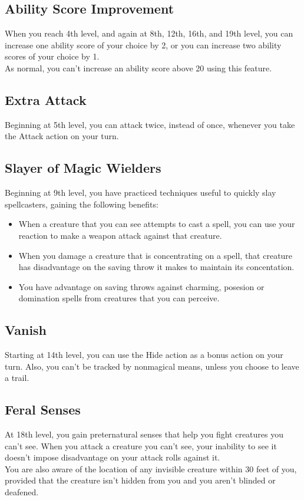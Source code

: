 \documentclass[11pt,a4paper,twocolumn, sans]{article}
\begin{document}
	\subsection*{Ability Score Improvement}
	When you reach 4th level, and again at 8th, 12th, 16th, and 19th level, you can increase one ability score of your choice by 2, or you can increase two ability scores of your choice by 1. \\
	As normal, you can’t increase an ability score above 20 using this feature.
	
	\subsection*{Extra Attack}
	Beginning at 5th level, you can attack twice, instead of once, whenever you take the Attack action on your turn.
	
	\subsection*{Slayer of Magic Wielders}
	Beginning at 9th level, you have practiced techniques useful to quickly slay spellcasters, gaining the following benefits:
	\begin{itemize}
		\item  When a creature that you can see attempts to cast a spell, you can use your reaction to make a weapon attack against that creature.
		\item When you damage a creature that is concentrating on a spell, that creature has disadvantage on the saving throw it makes to maintain its concentation.
		\item You have advantage on saving throws against charming, posesion or 	domination spells from creatures that you can perceive.
	\end{itemize}
	
	\subsection*{Vanish}
	Starting at 14th level, you can use the Hide action as a bonus action on your turn. Also, you can’t be tracked by nonmagical means, unless you choose to leave a trail.
	
	\subsection*{Feral Senses}
	At 18th level, you gain preternatural senses that help you fight creatures you can’t see. When you attack a creature you can’t see, your inability to see it doesn’t impose disadvantage on your attack rolls against it. \\
	You are also aware of the location of any invisible creature within 30 feet of you, provided that the creature isn’t hidden from you and you aren’t blinded or deafened.
	
\end{document}

